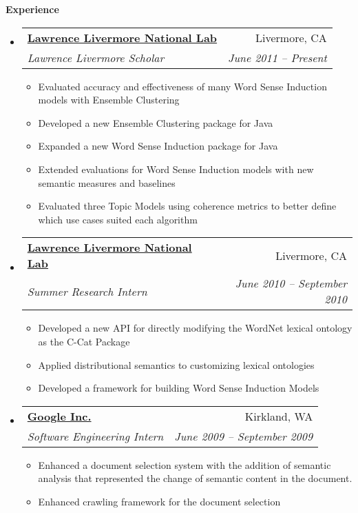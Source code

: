 \documentclass[letterpaper,11pt]{article}
\makeatletter
\newcommand{\resitem}[1]{\item #1 \vspace{-2pt}}
\newcommand{\resheading}[1]{{\large \colorbox{mygrey}{\begin{minipage}{\textwidth}{\textbf{#1 \vphantom{p\^{E}}}}\end{minipage}}}}
\newcommand{\ressubheading}[4]{
\begin{tabular*}{6.5in}{l@{\extracolsep{\fill}}r}
		\textbf{#1} & #2 \\
		\textit{#3} & \textit{#4} \\
\end{tabular*}\vspace{-6pt}}
\makeatother
\begin{document}
\resheading{Experience}
  \begin{itemize}
    \item \ressubheading{\href{http://www.llnl.gov}
                              {Lawrence Livermore National Lab}}
                        {Livermore, CA}
                        {Lawrence Livermore Scholar}
                        {June 2011 -- Present}
          { \footnotesize
            \begin{itemize}
              \resitem{Evaluated accuracy and effectiveness of many Word Sense
                       Induction models with Ensemble Clustering}
              \resitem{Developed a new Ensemble Clustering package for Java}
              \resitem{Expanded a new Word Sense Induction package for Java}
              \resitem{Extended evaluations for Word Sense Induction models with
                       new semantic measures and baselines}
              \resitem{Evaluated three Topic Models using coherence metrics
                       to better define which use cases suited each algorithm}
            \end{itemize}
          }
    \item \ressubheading{\href{http://www.llnl.gov}
                              {Lawrence Livermore National Lab}}
                        {Livermore, CA}
                        {Summer Research Intern}
                        {June 2010 -- September 2010}
          { \footnotesize
            \begin{itemize}
              \resitem{Developed a new API for directly modifying the WordNet
                       lexical ontology as the C-Cat Package}
              \resitem{Applied distributional semantics to customizing lexical
                       ontologies}
              \resitem{Developed a framework for building Word Sense Induction
                       Models}
            \end{itemize}
          }
    \item \ressubheading{\href{http://www.Google.com}
                              {Google Inc.}}
                        {Kirkland, WA}
                        {Software Engineering Intern}
                        {June 2009 -- September 2009}
          { \footnotesize
            \begin{itemize}
              \resitem{Enhanced a document selection system with the addition of
                       semantic analysis that represented the change of semantic
                       content in the document.}
              \resitem{Enhanced crawling framework for the document selection
}
\end{itemize}}
\end{itemize}
\end{document}
